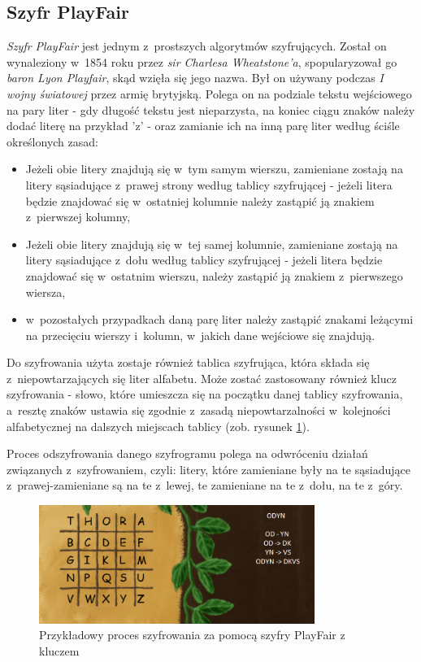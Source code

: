 \documentclass[12pt,a4paper,oneside]{book}
\theoremstyle{definition}
\numberwithin{equation}{chapter}
\begin{document}
\subsection{Szyfr PlayFair}
\par \textit{Szyfr PlayFair} jest jednym z~prostszych algorytmów szyfrujących. Został on wynaleziony w~1854 roku przez \textit{sir Charlesa Wheatstone'a}, spopularyzował go \textit{baron Lyon Playfair}, skąd wzięła się jego nazwa. Był on używany podczas \textit{I wojny światowej} przez armię brytyjską. Polega on na podziale tekstu wejściowego na pary liter - gdy długość tekstu jest nieparzysta, na koniec ciągu znaków należy dodać literę na przykład 'z' - oraz zamianie ich na inną parę liter według ściśle określonych zasad:
\begin{itemize}
    \item Jeżeli obie litery znajdują się w~tym samym wierszu, zamieniane zostają na litery sąsiadujące z~prawej strony według tablicy szyfrującej - jeżeli litera będzie znajdować się w~ostatniej kolumnie należy zastąpić ją znakiem z~pierwszej kolumny,
    \item Jeżeli obie litery znajdują się w~tej samej kolumnie, zamieniane zostają na litery sąsiadujące z~dołu według tablicy szyfrującej - jeżeli litera będzie znajdować się w~ostatnim wierszu, należy zastąpić ją znakiem z~pierwszego wiersza,
    \item w~pozostałych przypadkach daną parę liter należy zastąpić znakami leżącymi na przecięciu wierszy i~kolumn, w~jakich dane wejściowe się znajdują.
\end{itemize}
\par Do szyfrowania użyta zostaje również tablica szyfrująca, która składa się z~niepowtarzających się liter alfabetu. Może zostać zastosowany również klucz szyfrowania - słowo, które umieszcza się na początku danej tablicy szyfrowania, a~resztę znaków ustawia się zgodnie z~zasadą niepowtarzalności w~kolejności alfabetycznej na dalszych miejscach tablicy (zob. rysunek \ref{TablicaSzyfrowania}). 
\par Proces odszyfrowania danego szyfrogramu polega na odwróceniu działań związanych z~szyfrowaniem, czyli: litery, które zamieniane były na te sąsiadujące z~prawej-zamieniane są na te z~lewej, te zamieniane na te z~dołu, na te z~góry.
\begin{figure}[hpt!]
        \centering
        \includegraphics[width=0.8\textwidth]{images/PLAYFAIR_PRZYKLAD.png}
        \caption{Przykładowy proces szyfrowania za pomocą szyfry PlayFair z kluczem}
        \label{TablicaSzyfrowania}
\end{figure}
\end{document}
